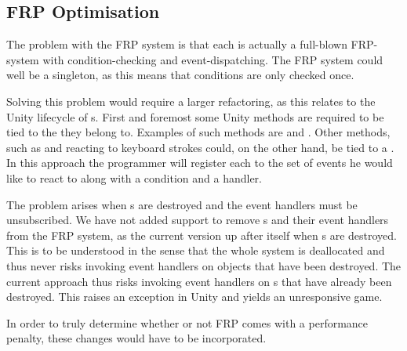 \subsection{FRP Optimisation} \label{sec:fw:frp:optimisation}
The problem with the \gls{FRP} system is that each  is actually a full-blown \gls{FRP}-system with condition-checking and event-dispatching. The \gls{FRP} system could well be a singleton, as this means that conditions are only checked once.

Solving this problem would require a larger refactoring, as this relates to the Unity lifecycle of s. First and foremost some Unity methods are required to be tied to the  they belong to. Examples of such methods are  and . Other methods, such as  and reacting to keyboard strokes could, on the other hand, be tied to a . In this approach the programmer will register each  to the set of events he would like to react to along with a condition and a handler.

The problem arises when s are destroyed and the event handlers must be unsubscribed. We have not added support to remove s and their event handlers from the \gls{FRP} system, as the current version  up after itself when s are destroyed. This is to be understood in the sense that the whole system is deallocated and thus never risks invoking event handlers on objects that have been destroyed. The current approach thus risks invoking event handlers on s that have already been destroyed. This raises an exception in Unity and yields an unresponsive game.

In order to truly determine whether or not \gls{FRP} comes with a performance penalty, these changes would have to be incorporated.
